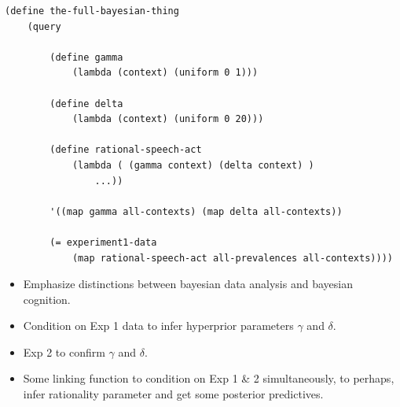 \documentclass[10pt,letterpaper]{article}
\begin{document}
\begin{lstlisting}
(define the-full-bayesian-thing
	(query
	
		(define gamma
			(lambda (context) (uniform 0 1)))
			
		(define delta
			(lambda (context) (uniform 0 20)))
	
		(define rational-speech-act
			(lambda ( (gamma context) (delta context) ) 
				...))
				
		'((map gamma all-contexts) (map delta all-contexts))
		
		(= experiment1-data 
			(map rational-speech-act all-prevalences all-contexts))))
\end{lstlisting}

\begin{itemize}

\item Emphasize distinctions between bayesian data analysis and bayesian cognition. 

\item Condition on Exp 1 data to infer hyperprior parameters $\gamma$ and $\delta$. 

\item Exp 2 to confirm $\gamma$ and $\delta$. 

\item Some linking function to condition on Exp 1 \& 2 simultaneously,  to perhaps, infer rationality parameter and get some posterior predictives.

\end{itemize}

%
\end{document}
